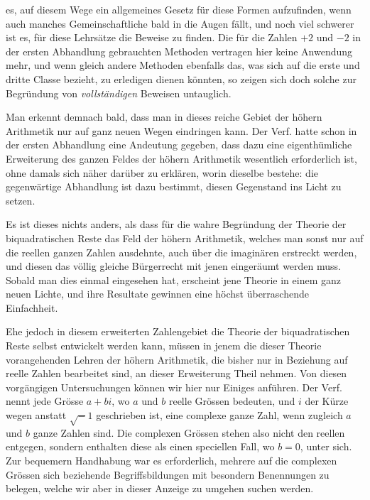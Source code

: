 %
es, auf diesem Wege ein allgemeines Gesetz für diese Formen aufzufinden, wenn auch manches Gemeinschaftliche bald in die Augen fällt, und noch viel schwerer ist es, für diese Lehrsätze die Beweise zu finden. Die für die Zahlen $+2$ und $-2$ in der ersten Abhandlung gebrauchten Methoden vertragen hier keine Anwendung mehr, und wenn gleich andere Methoden ebenfalls das, was sich auf die erste und dritte Classe bezieht, zu erledigen dienen könnten, so zeigen sich doch solche zur Begründung von \emph{vollständigen} Beweisen untauglich.

Man erkennt demnach bald, dass man in dieses reiche Gebiet der höhern Arithmetik nur auf ganz neuen Wegen eindringen kann. Der Verf. hatte schon in der ersten Abhandlung eine Andeutung gegeben, dass dazu eine eigenthümliche Erweiterung des ganzen Feldes der höhern Arithmetik wesentlich erforderlich ist, ohne damals sich näher darüber zu erklären, worin dieselbe bestehe: die gegenwärtige Abhandlung ist dazu bestimmt, diesen Gegenstand ins Licht zu setzen.

Es ist dieses nichts anders, als dass für die wahre Begründung der Theorie der biquadratischen Reste das Feld der höhern Arithmetik, welches man sonst nur auf die reellen ganzen Zahlen ausdehnte, auch über die imaginären erstreckt werden, und diesen das völlig gleiche Bürgerrecht mit jenen eingeräumt werden muss. Sobald man dies einmal eingesehen hat, erscheint jene Theorie in einem ganz neuen Lichte, und ihre Resultate gewinnen eine höchst überraschende Einfachheit.

Ehe jedoch in diesem erweiterten Zahlengebiet die Theorie der biquadratischen Reste selbst entwickelt werden kann, müssen in jenem die dieser Theorie vorangehenden Lehren der höhern Arithmetik, die bisher nur in Beziehung auf reelle Zahlen bearbeitet sind, an dieser Erweiterung Theil nehmen. Von diesen vorgängigen Untersuchungen können wir hier nur Einiges anführen. Der Verf. nennt jede Grösse $a+bi$, wo $a$ und $b$ reelle Grössen bedeuten, und $i$ der Kürze wegen anstatt $\surd-1$ geschrieben ist, eine complexe ganze Zahl, wenn zugleich $a$ und $b$ ganze Zahlen sind. Die complexen Grössen stehen also nicht den reellen entgegen, sondern enthalten diese als einen speciellen Fall, wo $b=0$, unter sich. Zur bequemern Handhabung war es erforderlich, mehrere auf die complexen Grössen sich beziehende Begriffsbildungen mit besondern Benennungen zu belegen, welche wir aber in dieser Anzeige zu umgehen suchen werden.

